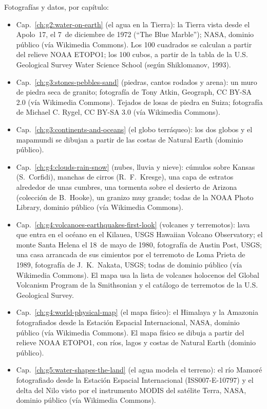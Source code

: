 \bigskip
\noindent Fotografías y datos, por capítulo:
\begin{itemize}\small
  \item Cap.~\ref{ch:g2:water-on-earth} (el agua en la Tierra): la Tierra vista desde el Apolo~17, el 7~de diciembre de 1972 (``The Blue Marble''); NASA, dominio público (vía Wikimedia Commons). Los 100 cuadrados se calculan a partir del relieve NOAA ETOPO1; los 100 cubos, a partir de la tabla de la U.S. Geological Survey Water Science School (según Shiklomanov, 1993).
  \item Cap.~\ref{ch:g3:stones-pebbles-sand} (piedras, cantos rodados y arena): un muro de piedra seca de granito; fotografía de Tony Atkin, Geograph, CC BY-SA 2.0 (vía Wikimedia Commons). Tejados de losas de piedra en Suiza; fotografía de Michael C. Rygel, CC BY-SA 3.0 (vía Wikimedia Commons).
  \item Cap.~\ref{ch:g3:continents-and-oceans} (el globo terráqueo): los dos globos y el mapamundi se dibujan a partir de las costas de Natural Earth (dominio público).
  \item Cap.~\ref{ch:g4:clouds-rain-snow} (nubes, lluvia y nieve): cúmulos sobre Kansas (S.~Corfidi), manchas de cirros (R.~F.~Kresge), una capa de estratos alrededor de unas cumbres, una tormenta sobre el desierto de Arizona (colección de B.~Hooke), un granizo muy grande; todas de la NOAA Photo Library, dominio público (vía Wikimedia Commons).
  \item Cap.~\ref{ch:g4:volcanoes-earthquakes-first-look} (volcanes y terremotos): lava que entra en el océano en el Kilauea, USGS Hawaiian Volcano Observatory; el monte Santa Helena el 18~de mayo de 1980, fotografía de Austin Post, USGS; una casa arrancada de sus cimientos por el terremoto de Loma Prieta de 1989, fotografía de J.~K.~Nakata, USGS; todas de dominio público (vía Wikimedia Commons). El mapa usa la lista de volcanes holocenos del Global Volcanism Program de la Smithsonian y el catálogo de terremotos de la U.S. Geological Survey.
  \item Cap.~\ref{ch:g4:world-physical-map} (el mapa físico): el Himalaya y la Amazonia fotografiados desde la Estación Espacial Internacional, NASA, dominio público (vía Wikimedia Commons). El mapa físico se dibuja a partir del relieve NOAA ETOPO1, con ríos, lagos y costas de Natural Earth (dominio público).
  \item Cap.~\ref{ch:g5:water-shapes-the-land} (el agua modela el terreno): el río Mamoré fotografiado desde la Estación Espacial Internacional (ISS007-E-10797) y el delta del Nilo visto por el instrumento MODIS del satélite Terra, NASA, dominio público (vía Wikimedia Commons).

\end{itemize}

